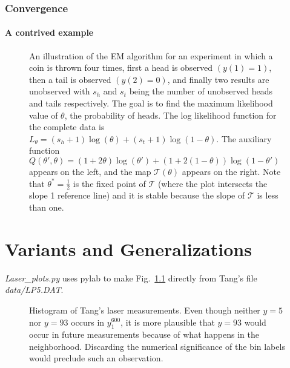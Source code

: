 \documentclass[prelim,showlabels]{book}
\newcommand{\parameters}{\theta}
\newcommand{\ti}[2]{{#1}{(#2)}}                  %
\newcommand{\ts}[3]{#1_{#2}^{#3}}                    %
\newcommand{\EMmap}{{\mathcal T}} %
\begin{document}
\addtocounter{subsection}{1}

\afterpage{\clearpage} %
\newpage
\subsection{Convergence}

\subsubsection{A contrived example}
\label{sec:contrived}

\begin{figure}[htbp]
  \caption[An illustration of the EM algorithm.]%
  {An illustration of the EM algorithm for an experiment in which a
    coin is thrown four times, first a head is observed
    $(\ti{y}{1}=1)$, then a tail is observed $(\ti{y}{2}=0)$, and
    finally two results are unobserved with $s_h$ and $s_t$ being the
    number of unobserved heads and tails respectively.  The goal is to
    find the maximum likelihood value of $\parameters$, the
    probability of heads.  The log likelihood function for the
    complete data is $L_{\parameters} = (s_h + 1)\log(\parameters) +
    (s_t +1)\log(1-\parameters)$.  The auxiliary function
    $Q(\parameters',\parameters) = (1+2\parameters)\log(\parameters')
    + (1 + 2(1-\parameters))\log(1-\parameters')$ appears on the left,
    and the map $\EMmap(\parameters)$ appears on the right.  Note that
    $\parameters^* = \frac{1}{2}$ is the fixed point of $\EMmap$
    (where the plot intersects the slope 1 reference line) and it is stable
    because the slope of $\EMmap$ is less than one.}
  \label{fig:EM}
\end{figure}

\chapter{Variants and Generalizations}
\label{chap:variants}

\emph{Laser\_plots.py} uses pylab to make Fig.~\ref{fig:LaserHist} directly
from Tang's file \emph{data/LP5.DAT}.
\begin{figure}[htbp]
  \caption[Histogram of Tang's laser measurements.]%
  {Histogram of Tang's laser measurements.  Even though neither $y=5$
    nor $y=93$ occurs in $\ts{y}{1}{600}$, it is more plausible that
    $y=93$ would occur in future measurements because of what happens
    in the neighborhood.  Discarding the numerical significance of the
    bin labels would preclude such an observation. }
  \label{fig:LaserHist}
\end{figure}
\end{document}
